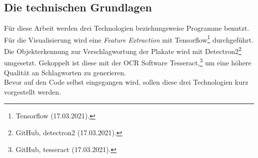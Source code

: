 \documentclass[a4paper,12pt,ngerman]{article}
\begin{document}
\subsection{Die technischen Grundlagen}
Für diese Arbeit werden drei Technologien beziehungsweise Programme benutzt. Für die Visualisierung wird eine \textit{Feature Extraction} mit Tensorflow\footnote{Tensorflow (17.03.2021).}  durchgeführt. Die Objekterkennung zur Verschlagwortung der Plakate wird mit Detectron2\footnote{GitHub, detectron2 (17.03.2021).} umgesetzt. Gekoppelt ist diese mit der OCR Software Tesseract,\footnote{GitHub, tesseract (17.03.2021).} um eine höhere Qualität an Schlagworten zu generieren. \\
Bevor auf den Code selbst eingegangen wird, sollen diese drei Technologien kurz vorgestellt werden. \\
\end{document}
